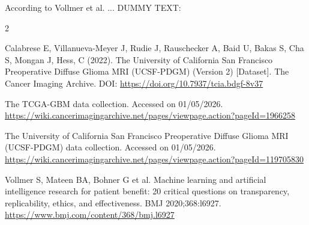\documentclass[11pt]{article}
\begin{document}
According to Vollmer et al. \cite{Vollmer2020} ...
DUMMY TEXT:
\lipsum[10]


\begin{footnotesize}
\begin{thebibliography}{2}

 Calabrese E, Villanueva-Meyer J, Rudie J, Rauschecker A, Baid U, Bakas S, Cha S, Mongan J, Hess, C (2022). The University of California San Francisco Preoperative Diffuse Glioma MRI (UCSF-PDGM) (Version 2) [Dataset].  The Cancer Imaging Archive.  DOI: \scriptsize{\url{https://doi.org/10.7937/tcia.bdgf-8v37}}

 The TCGA-GBM data collection. Accessed on 01/05/2026.\\ \scriptsize{\url{https://wiki.cancerimagingarchive.net/pages/viewpage.action?pageId=1966258}}

 The University of California San Francisco Preoperative Diffuse Glioma MRI (UCSF-PDGM) data collection. Accessed on 01/05/2026.\\ 
\scriptsize{\url{https://wiki.cancerimagingarchive.net/pages/viewpage.action?pageId=119705830}}

 Vollmer S, Mateen BA, Bohner G et al. Machine learning and artificial intelligence research for patient benefit: 20 critical questions on transparency, replicability, ethics, and effectiveness. BMJ 2020;368:l6927. \\
\scriptsize{\url{https://www.bmj.com/content/368/bmj.l6927}}


\end{thebibliography}
\end{footnotesize}
\end{document}
